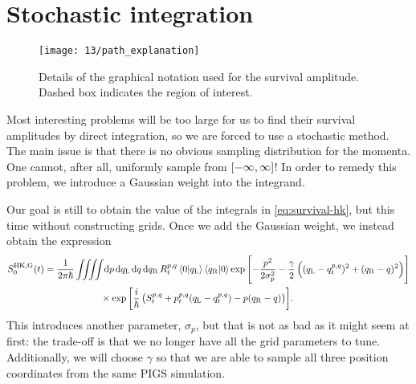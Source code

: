 \section{Stochastic integration}


\begin{figure}[h]
	\centering
	\texttt{[image: 13/path\_explanation]}
	\caption[
		Graphical notation for survival amplitude
	]{
		Details of the graphical notation used for the survival amplitude.
		Dashed box indicates the region of interest.
	}
	\label{fig:survival-path-explanation}
\end{figure}

Most interesting problems will be too large for us to find their survival amplitudes by direct integration, so we are forced to use a stochastic method.
The main issue is that there is no obvious sampling distribution for the momenta.
One cannot, after all, uniformly sample from $\intcc{-\infty, \infty}$!
In order to remedy this problem, we introduce a Gaussian weight into the integrand.

Our goal is still to obtain the value of the integrals in \vref{eq:survival-hk}, but this time without constructing grids.
Once we add the Gaussian weight, we instead obtain the expression
\begin{align}
	S_0\hkg(t)
	&= \frac{1}{2 \pi \hbar} \iiiint\! \dif p \dif q\LLup \dif q \dif q\RRup \,
			R\coh{p}{q}_t \braket{0 | q\LLup} \braket{q\RRup | 0}
			\expb{
				-\frac{p^2}{2 \sigma_p^2}
				- \frac{\gamma}{2} \left( (q\LLup - q\coh{p}{q}_t)^2 + (q\RRup - q)^2 \right)
			} \notag \\
	&\qquad\qquad\qquad\times
			\expb{\frac{i}{\hbar} \left( S\coh{p}{q}_t + p\coh{p}{q}_t (q\LLup - q\coh{p}{q}_t) - p (q\RRup - q) \right)}.
\end{align}
This introduces another parameter, $\sigma_p$, but that is not as bad as it might seem at first: the trade-off is that we no longer have all the grid parameters to tune.
Additionally, we will choose $\gamma$ so that we are able to sample all three position coordinates from the same PIGS simulation.

